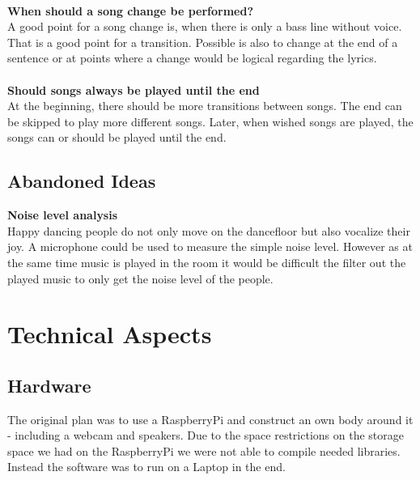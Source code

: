 \documentclass{article}
\begin{document}
\\
\textbf{When should a song change be performed?} \\
A good point for a song change is, when there is only a bass line without voice. That is a good point for a transition. Possible is also to change at the end of a sentence or at points where a change would be logical regarding the lyrics. \\
\\
\textbf{Should songs always be played until the end} \\
At the beginning, there should be more transitions between songs. The end can be skipped to play more different songs. Later, when wished songs are played, the songs can or should be played until the end.  

\subsection{Abandoned Ideas}

\textbf{Noise level analysis}\\
Happy dancing people do not only move on the dancefloor but also vocalize their joy. A microphone could be used to measure the simple noise level. However as at the same time music is played in the room it would be difficult the filter out the played music to only get the noise level of the people.


\section{Technical Aspects}


\subsection{Hardware}

The original plan was to use a RaspberryPi and construct an own body around it - including a webcam and speakers. Due to the space restrictions on the storage space we had on the RaspberryPi we were not able to compile needed libraries. Instead the software was to run on a Laptop in the end.

\end{document}
